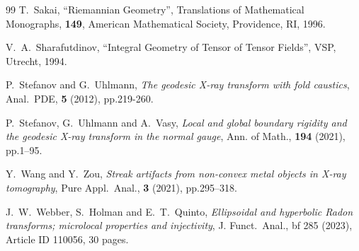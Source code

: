 \documentclass[a4paper,11pt,reqno]{amsart}
\numberwithin{equation}{section}
\theoremstyle{definition}
\theoremstyle{remark}
\begin{document}
\begin{thebibliography}{99}
T.~Sakai, 
``Riemannian Geometry'', 
Translations of Mathematical Monographs, {\bf 149}, 
American Mathematical Society, 
Providence, RI, 1996.

V.~A.~Sharafutdinov, 
``Integral Geometry of Tensor of Tensor Fields'',  
VSP, Utrecht, 1994.

P.~Stefanov and G.~Uhlmann, 
{\it The geodesic X-ray transform with fold caustics}, 
Anal.\ PDE, {\bf 5} (2012), pp.219-260. 

P.~Stefanov, G.~Uhlmann and A.~Vasy, 
{\it Local and global boundary rigidity and the geodesic X-ray transform in the normal gauge}, Ann. of Math., {\bf 194} (2021), pp.1--95.

Y.~Wang and Y.~Zou, 
{\it Streak artifacts from non-convex metal objects in X-ray tomography}, 
Pure Appl.\ Anal., {\bf 3} (2021), pp.295--318.

J.~W.~Webber, S.~Holman and E.~T.~Quinto, 
{\it Ellipsoidal and hyperbolic Radon transforms;
microlocal properties and injectivity}, 
J. Funct.\ Anal., {bf 285} (2023), Article ID 110056, 30 pages. 
\end{thebibliography}
\end{document}
